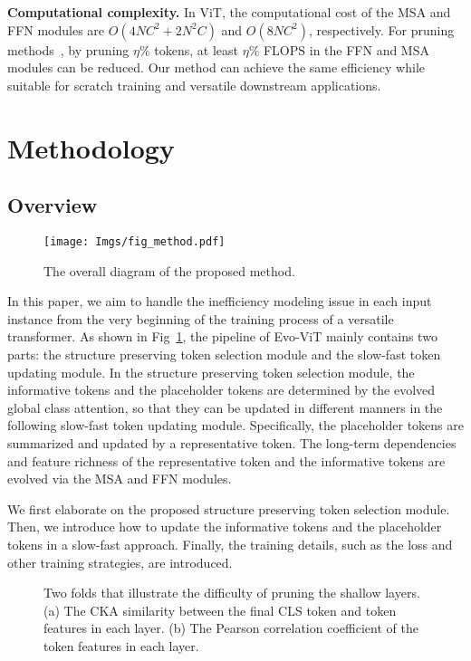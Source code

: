 \documentclass[letterpaper]{article} \usepackage{aaai22}  \usepackage{times}  \usepackage{helvet}  \usepackage{courier}  \usepackage[hyphens]{url}  \usepackage{graphicx} \urlstyle{rm} \def\UrlFont{\rm}  \usepackage{natbib}  \usepackage{caption} \DeclareCaptionStyle{ruled}{labelfont=normalfont,labelsep=colon,strut=off} \frenchspacing  \setlength{\pdfpagewidth}{8.5in}  \setlength{\pdfpageheight}{11in}  \usepackage{algorithm}
\begin{document}
\noindent\textbf{Computational complexity.}
In ViT, the computational cost of the MSA and FFN modules are $O(4NC^{2}+2N^{2}C)$ and $O(8NC^{2})$, respectively. For pruning methods~\cite{DynamicViT, PatchSlimming}, by pruning $\eta\%$ tokens, at least $\eta\%$ FLOPS in the FFN and MSA modules can be reduced. Our method can achieve the same efficiency while suitable for scratch training and versatile downstream applications. 
\section{Methodology}
\label{sec:methodlogy}
\subsection{Overview}

\begin{figure}
    \centering
    \texttt{[image: Imgs/fig\_method.pdf]} \caption{The overall diagram of the proposed method.}
    \label{fig:method}
    \vspace{-4mm}
\end{figure} In this paper, we aim to handle the inefficiency modeling issue in each input instance from the very beginning of the training process of a versatile transformer. 
As shown in Fig~\ref{fig:method}, the pipeline of Evo-ViT mainly contains two parts: the structure preserving token selection module and the slow-fast token updating module. In the structure preserving token selection module, the informative tokens and the placeholder tokens are determined by the evolved global class attention, so that they can be updated in different manners in the following slow-fast token updating module. Specifically, the placeholder tokens are summarized and updated by a representative token. The long-term dependencies and feature richness of the representative token and the informative tokens are evolved via the MSA and FFN modules.  

We first elaborate on the proposed structure preserving token selection module. Then, we introduce how to update the informative tokens and the placeholder tokens in a slow-fast approach. Finally, the training details, such as the loss and other training strategies, are introduced.








\begin{figure}[t]
    \centering  {}
    \caption{Two folds that illustrate the difficulty of pruning the shallow layers. (a) The CKA similarity between the final CLS token and token features in each layer. (b) The Pearson correlation coefficient of the token features in each layer.}
    \label{fig:cor_analysis}
    \vspace{-5mm}
\end{figure} 
\end{document}
